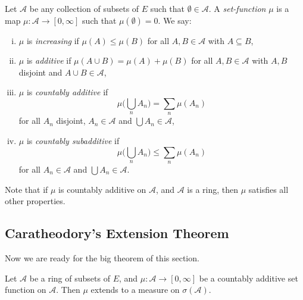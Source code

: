 \documentclass[12pt]{article}
\begin{document}

\begin{definition}
	Let $\mathcal{A}$ be any collection of subsets of $E$ such that $\emptyset \in \mathcal{A}$. A \emph{set-function} $\mu$ is a map $\mu : \mathcal{A} \to [0, \infty]$ such that $\mu(\emptyset) = 0$. We say:
	\begin{enumerate}[(i)]
		\item $\mu$ is \emph{increasing} if $\mu(A) \le \mu(B)$ for all $A, B \in \mathcal{A}$ with $A \subseteq B$,
		\item $\mu$ is \emph{additive} if $\mu(A \cup B) = \mu(A) + \mu(B)$ for all $A, B \in \mathcal{A}$ with $A, B$ disjoint and $A \cup B \in \mathcal{A}$,
		\item $\mu$ is \emph{countably additive} if
			\[
			\mu \Biggl( \bigcup_{n} A_n \Biggr) = \sum_n \mu(A_n)
			\]
			for all $A_n$ disjoint, $A_n \in \mathcal{A}$ and $\bigcup A_n \in \mathcal{A}$,
		\item $\mu$ is \emph{countably subadditive} if
			\[
			\mu \Biggl( \bigcup_n A_n \Biggr) \le \sum_n \mu(A_n)
			\]
			for all $A_n \in \mathcal{A}$ and $\bigcup A_n \in \mathcal{A}$.
	\end{enumerate}
\end{definition}

Note that if $\mu$ is countably additive on $\mathcal{A}$, and $\mathcal{A}$ is a ring, then $\mu$ satisfies all other properties.

\subsection{Caratheodory's Extension Theorem}
\label{sub:extension}

Now we are ready for the big theorem of this section.

\begin{theorem}[Caratheodory]
	Let $\mathcal{A}$ be a ring of subsets of $E$, and $\mu : \mathcal{A} \to [0, \infty]$ be a countably additive set function on $\mathcal{A}$. Then $\mu$ extends to a measure on $\sigma(\mathcal{A})$.
\end{theorem}
\end{document}
